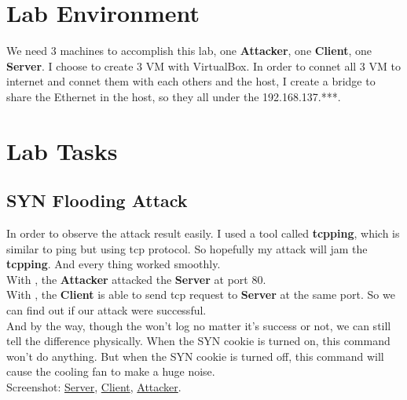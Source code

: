 \documentclass{article}
\begin{document}
\maketitle
\section{Lab Environment}
We need 3 machines to accomplish this lab, one \textbf{Attacker}, one \textbf{Client}, one \textbf{Server}. I choose to create 3 VM with VirtualBox. In order to connet all 3 VM to internet and connet them with each others and the host, I create a bridge to share the Ethernet in the host, so they all under the 192.168.137.***.
\section{Lab Tasks}

\subsection{SYN Flooding Attack}
In order to observe the attack result easily. I used a tool called \textbf{tcpping}, which is similar to ping but using tcp protocol. So hopefully my attack will jam the \textbf{tcpping}. And every thing worked smoothly.\\
With , the \textbf{Attacker} attacked the \textbf{Server} at port 80.\\
With , the \textbf{Client} is able to send tcp request to \textbf{Server} at the same port. So we can find out if our attack were successful.\\
And by the way, though the  won't log no matter it's success or not, we can still tell the difference physically. When the SYN cookie is turned on, this command won't do anything. But when the SYN cookie is turned off, this command will cause the cooling fan to make a huge noise.\\
Screenshot: 
\href{https://i.loli.net/2018/09/05/5b8f645f3315a.png}{Server},
\href{https://i.loli.net/2018/09/05/5b8f645f325cf.png}{Client},
\href{https://i.loli.net/2018/09/05/5b8f645f31ca2.png}{Attacker}.
\end{document}
